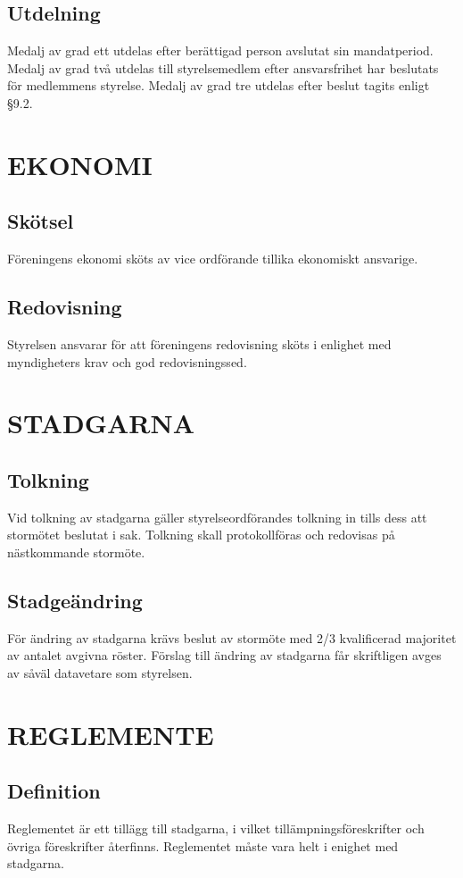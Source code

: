 \documentclass[a4paper]{article}
\begin{document}
{\subsection{Utdelning}
Medalj av grad ett utdelas efter berättigad person avslutat sin mandatperiod. Medalj av grad två utdelas till styrelsemedlem efter ansvarsfrihet har beslutats för medlemmens styrelse. Medalj av grad tre utdelas efter beslut tagits enligt §9.2.
\section{EKONOMI}
{\subsection{Skötsel}
  Föreningens ekonomi sköts av vice ordförande tillika ekonomiskt ansvarige.
  \subsection{Redovisning}
  Styrelsen ansvarar för att föreningens redovisning sköts i enlighet med myndigheters krav och god redovisningssed.}
\section{STADGARNA}
{\subsection{Tolkning}
  Vid tolkning av stadgarna gäller styrelseordförandes tolkning in tills dess att stormötet beslutat i sak. Tolkning skall protokollföras och redovisas på nästkommande stormöte.
  \subsection{Stadgeändring}
  För ändring av stadgarna krävs beslut av stormöte med 2/3 kvalificerad majoritet av antalet avgivna röster. Förslag till ändring av stadgarna får skriftligen avges av såväl datavetare som styrelsen.}
\section{REGLEMENTE}
{\subsection{Definition}
  Reglementet är ett tillägg till stadgarna, i vilket tillämpningsföreskrifter och övriga föreskrifter återfinns. Reglementet måste vara helt i enighet med stadgarna.
}}
\end{document}

